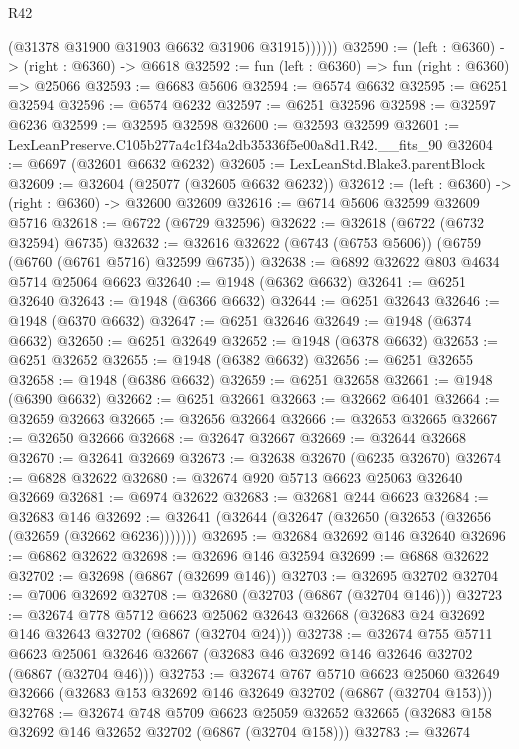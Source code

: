 \begin{lexlean}{R42}
\begin{coremodule}
{              (@31378 @31900 @31903 @6632 @31906 @31915))))))
@32590 := (left : @6360) -> (right : @6360) -> @6618
@32592 := fun (left : @6360) => fun (right : @6360) => @25066
@32593 := @6683 @5606
@32594 := @6574 @6632
@32595 := @6251 @32594
@32596 := @6574 @6232
@32597 := @6251 @32596
@32598 := @32597 @6236
@32599 := @32595 @32598
@32600 := @32593 @32599
@32601 := LexLeanPreserve.C105b277a4c1f34a2db35336f5e00a8d1.R42.__fits_90
@32604 := @6697 (@32601 @6632 @6232)
@32605 := LexLeanStd.Blake3.parentBlock
@32609 := @32604 (@25077 (@32605 @6632 @6232))
@32612 := (left : @6360) -> (right : @6360) -> @32600 @32609
@32616 := @6714 @5606 @32599 @32609 @5716
@32618 := @6722 (@6729 @32596)
@32622 := @32618 (@6722 (@6732 @32594) @6735)
@32632 := @32616 @32622 (@6743 (@6753 @5606)) (@6759 (@6760 (@6761 @5716) @32599 @6735))
@32638 := @6892 @32622 @803 @4634 @5714 @25064 @6623
@32640 := @1948 (@6362 @6632)
@32641 := @6251 @32640
@32643 := @1948 (@6366 @6632)
@32644 := @6251 @32643
@32646 := @1948 (@6370 @6632)
@32647 := @6251 @32646
@32649 := @1948 (@6374 @6632)
@32650 := @6251 @32649
@32652 := @1948 (@6378 @6632)
@32653 := @6251 @32652
@32655 := @1948 (@6382 @6632)
@32656 := @6251 @32655
@32658 := @1948 (@6386 @6632)
@32659 := @6251 @32658
@32661 := @1948 (@6390 @6632)
@32662 := @6251 @32661
@32663 := @32662 @6401
@32664 := @32659 @32663
@32665 := @32656 @32664
@32666 := @32653 @32665
@32667 := @32650 @32666
@32668 := @32647 @32667
@32669 := @32644 @32668
@32670 := @32641 @32669
@32673 := @32638 @32670 (@6235 @32670)
@32674 := @6828 @32622
@32680 := @32674 @920 @5713 @6623 @25063 @32640 @32669
@32681 := @6974 @32622
@32683 := @32681 @244 @6623
@32684 := @32683 @146
@32692 := @32641 (@32644 (@32647 (@32650 (@32653 (@32656 (@32659 (@32662 @6236)))))))
@32695 := @32684 @32692 @146 @32640
@32696 := @6862 @32622
@32698 := @32696 @146 @32594
@32699 := @6868 @32622
@32702 := @32698 (@6867 (@32699 @146))
@32703 := @32695 @32702
@32704 := @7006 @32692
@32708 := @32680 (@32703 (@6867 (@32704 @146)))
@32723 := @32674
    @778
    @5712
    @6623
    @25062
    @32643
    @32668
    (@32683 @24 @32692 @146 @32643 @32702 (@6867 (@32704 @24)))
@32738 := @32674
    @755
    @5711
    @6623
    @25061
    @32646
    @32667
    (@32683 @46 @32692 @146 @32646 @32702 (@6867 (@32704 @46)))
@32753 := @32674
    @767
    @5710
    @6623
    @25060
    @32649
    @32666
    (@32683 @153 @32692 @146 @32649 @32702 (@6867 (@32704 @153)))
@32768 := @32674
    @748
    @5709
    @6623
    @25059
    @32652
    @32665
    (@32683 @158 @32692 @146 @32652 @32702 (@6867 (@32704 @158)))
@32783 := @32674
}
\end{coremodule}
\end{lexlean}
